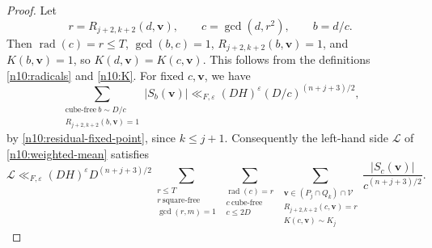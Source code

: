 \documentclass[a4paper,11pt, twoside,reqno]{amsart}
\theoremstyle{plain}
\theoremstyle{definition}
\theoremstyle{remark}
\newcommand{\bfv}{\bm{v}}
\newcommand{\ve}{\varepsilon}
\renewcommand{\le}{\leqslant}
\newcommand{\rad}{\operatorname{rad}}
\numberwithin{equation}{section}
\begin{document}
\begin{proof}
Let
\[
 r=R_{j+2,k+2}(d,\bfv),\qquad c=\gcd(d,r^2),\qquad b=d/c.
\]
Then $\rad(c)=r\le T$, $\gcd(b,c)=1$, $R_{j+2,k+2}(b,\bfv)=1$,
and $K(b,\bfv)=1$, so $K(d,\bfv)=K(c,\bfv)$.
This follows from the definitions \eqref{n10:radicals} and \eqref{n10:K}.
For fixed $c,\bfv$,
we have
\begin{equation}\label{eq:fix-cv}
    \sum_{\substack{\mathrm{cube\text{-}free}\ b\sim D/c \\ R_{j+2,k+2}(b,\bfv)=1}}
|S_b(\bfv)| \ll_{F,\ve} (DH)^\ve (D/c)^{(n+j+3)/2},
\end{equation}
by \eqref{n10:residual-fixed-point}, since $k\le j+1$.
Consequently the left-hand side $\mathcal L$ of \eqref{n10:weighted-mean} satisfies
\begin{equation}\label{n10:small-radical-allocation}
\mathcal L\ll_{F,\ve} (DH)^\ve D^{(n+j+3)/2}
\sum_{\substack{r\le T\\r\ \mathrm{square\text{-}free}\\\gcd(r,m)=1}}
\sum_{\substack{\rad(c)=r\\c\ \mathrm{cube\text{-}free}\\c\le2D}}
\sum_{\substack{\bfv\in(P_j\cap Q_k)\cap\mathcal V\\
R_{j+2,k+2}(c,\bfv)=r\\K(c,\bfv)\sim K_j}}
\frac{|S_c(\bfv)|}{c^{(n+j+3)/2}}.
\end{equation}


\end{proof}
\end{document}
